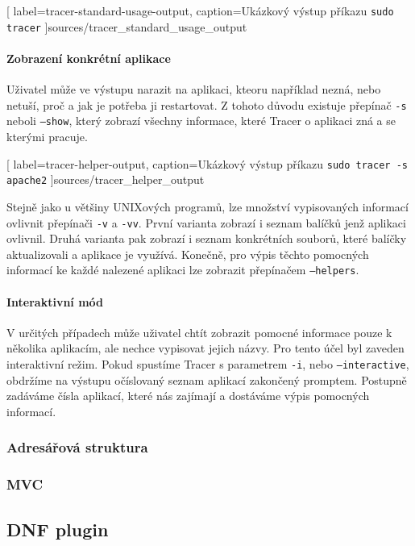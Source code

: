 \documentclass[10pt,a4paper]{article}
\begin{document}
				
				[
					label=tracer-standard-usage-output,
					caption={Ukázkový výstup příkazu \texttt{sudo tracer}}
				]{sources/tracer_standard_usage_output}

				\paragraph{Zobrazení konkrétní aplikace}
				Uživatel může ve výstupu narazit na aplikaci, kteoru například nezná, nebo netuší, proč a jak je potřeba ji restartovat. Z tohoto důvodu existuje přepínač \texttt{-s} neboli \texttt{--show}, který zobrazí všechny informace, které Tracer o aplikaci zná a se kterými pracuje.

				
				[
					label=tracer-helper-output,
					caption={Ukázkový výstup příkazu \texttt{sudo tracer -s apache2}}
				]{sources/tracer_helper_output}

				Stejně jako u většiny UNIXových programů, lze množství vypisovaných informací ovlivnit přepínači \texttt{-v} a \texttt{-vv}. První varianta zobrazí i seznam balíčků jenž aplikaci ovlivnil. Druhá varianta pak zobrazí i seznam konkrétních souborů, které balíčky aktualizovali a aplikace je využívá. Konečně, pro výpis těchto pomocných informací ke každé nalezené aplikaci lze zobrazit přepínačem \texttt{--helpers}.

				\paragraph{Interaktivní mód}
				V určitých případech může uživatel chtít zobrazit pomocné informace pouze k několika aplikacím, ale nechce vypisovat jejich názvy. Pro tento účel byl zaveden interaktivní režim. Pokud spustíme Tracer s parametrem \texttt{-i}, nebo \texttt{--interactive}, obdržíme na výstupu očíslovaný seznam aplikací zakončený promptem. Postupně zadáváme čísla aplikací, které nás zajímají a dostáváme výpis pomocných informací.

			\subsubsection{Adresářová struktura}
			\subsubsection{MVC}

		\subsection{DNF plugin}
\end{document}

